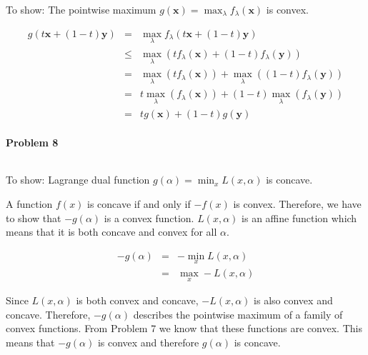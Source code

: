 \documentclass{article}
\renewcommand{\Vec}[1]{\ensuremath{\mathbf{#1}}}
\begin{document}
To show: The pointwise maximum $g(\Vec{x}) = \max_{\lambda}f_{\lambda}(\Vec{x})$ is convex.

\begin{eqnarray}
g(t\Vec{x} + (1-t)\Vec{y}) &=& \max_{\lambda}f_{\lambda}(t\Vec{x} + (1-t)\Vec{y})\\
&\leq& \max_{\lambda}\left( tf_{\lambda}(\Vec{x}) + (1-t)f_{\lambda}(\Vec{y})\right)\\
&=& \max_{\lambda}\left( tf_{\lambda}(\Vec{x})\right) + \max_{\lambda}\left((1-t)f_{\lambda}(\Vec{y})\right)\\
&=& t\max_{\lambda}\left( f_{\lambda}(\Vec{x})\right) + (1-t)\max_{\lambda}\left(f_{\lambda}(\Vec{y})\right)\\
&=& tg(\Vec{x}) + (1-t)g(\Vec{y})
\end{eqnarray}

\paragraph*{Problem 8}
$\;$ 

To show: Lagrange dual function $g(\alpha) = \min_x L(x,\alpha)$ is concave.

A function $f(x)$ is concave if and only if $-f(x)$ is convex. Therefore, we have to show that $-g(\alpha)$ is a convex function. $L(x, \alpha)$ is an affine function which means that it is both concave and convex for all $\alpha$.

\begin{eqnarray}
-g(\alpha) &=& -\min_x L(x,\alpha)\\
&=& \max_x -L(x,\alpha)
\end{eqnarray}

Since $L(x, \alpha)$ is both convex and concave, $-L(x, \alpha)$ is also convex and concave. Therefore, $-g(\alpha)$ describes the pointwise maximum of a family of convex functions. From Problem 7 we know that these functions are convex. This means that $-g(\alpha)$ is convex and therefore $g(\alpha)$ is concave.
\end{document}
